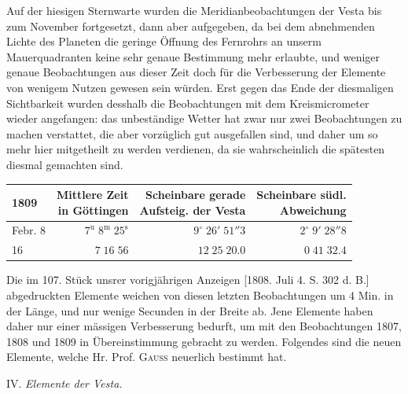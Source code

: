 \par\indent Auf der hiesigen Sternwarte wurden die Meridianbeobachtungen der Vesta bis zum November fortgesetzt, dann aber aufgegeben, da bei dem abnehmenden Lichte des Planeten die geringe Öffnung des Fernrohrs an unserm Mauerquadranten keine sehr genaue Bestimmung mehr erlaubte, und weniger genaue Beobachtungen aus dieser Zeit doch für die Verbesserung der Elemente von wenigem Nutzen gewesen sein würden. Erst gegen das Ende der diesmaligen Sichtbarkeit wurden desshalb die Beobachtungen mit dem Kreismicrometer wieder angefangen: das unbeständige Wetter hat zwar nur zwei Beobachtungen zu machen verstattet, die aber vorzüglich gut ausgefallen sind, und daher um so mehr hier
mitgetheilt zu werden verdienen, da sie wahrscheinlich die spätesten diesmal gemachten sind.


\begin{center}\fontsize{10}{12}\selectfont\setlength{\tabcolsep}{5pt}\renewcommand{\arraystretch}{1.15}\begin{tabular}{lrrr}
1809 & \shortstack{Mittlere Zeit\\in Göttingen} & \shortstack{Scheinbare gerade\\Aufsteig. der Vesta} & \shortstack{Scheinbare südl.\\Abweichung}\\
\hline
Febr. 8 & $7^{\text{u}}\;8^{\text{m}}\;25^{\text{s}}$ & $9^\circ\;26'\;51''3$ & $2^\circ\;9'\;28''8$\\
16 & $7\;16\;56$ & $12\;25\;20.0$ & $0\;41\;32.4$\\
\end{tabular}\end{center}


\par\indent Die im 107. Stück unsrer vorigjährigen Anzeigen [1808. Juli 4. S. 302 d. B.] abgedruckten Elemente weichen von diesen letzten Beobachtungen um 4 Min. in der Länge, und nur wenige Secunden in der Breite ab. Jene Elemente haben daher nur einer mässigen Verbesserung bedurft, um mit den Beobachtungen 1807, 1808 und 1809 in Übereinstimmung gebracht zu werden. Folgendes sind die neuen Elemente, welche Hr. Prof. \textsc{Gauss} neuerlich bestimmt hat.



\begin{center}
IV. \emph{Elemente der Vesta.}
\end{center}


